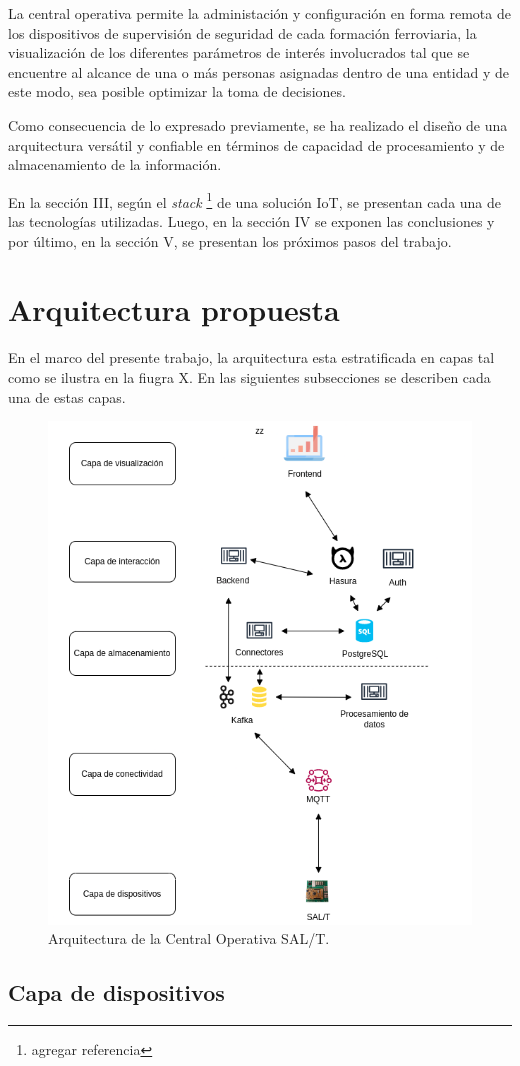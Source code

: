 \documentclass[a4paper]{IEEEtran}
\begin{document}
La central operativa permite la administación y configuración en forma remota de los dispositivos de supervisión de seguridad de cada formación ferroviaria, la visualización de los diferentes parámetros de interés involucrados tal que se encuentre al alcance de una o más personas asignadas dentro de una entidad y de este modo, sea posible optimizar la toma de decisiones.

Como consecuencia de lo expresado previamente, se ha realizado el diseño de una arquitectura versátil y confiable en términos de capacidad de procesamiento y de almacenamiento de la información.

En la sección III, según el \textit{stack} \cite{b2} \footnote{agregar referencia} de una solución IoT, se presentan cada una de las tecnologías utilizadas. Luego, en la sección IV se exponen las conclusiones y por último, en la sección V, se presentan los próximos pasos del trabajo.


\section{Arquitectura propuesta}

En el marco del presente trabajo, la arquitectura esta estratificada en capas
tal como se ilustra en la fiugra X. En las siguientes subsecciones se describen cada una de estas capas.

\begin{figure}[ht]
\centering 
\includegraphics[width=.5\textwidth]{diagram.png}
\caption{ \normalsize Arquitectura de la Central Operativa SAL/T.}
\label{fig:diagBloques}
\end{figure}


\subsection{Capa de dispositivos}
\end{document}
